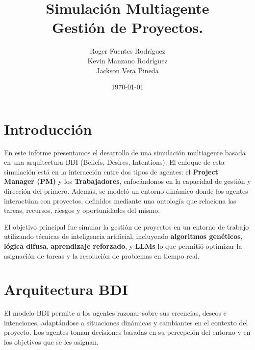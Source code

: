 \documentclass[a4paper, 12pt]{article}
\title{Simulación Multiagente \\ Gestión de Proyectos.}
\author{Roger Fuentes Rodr\'iguez \\ Kevin Manzano Rodr\'iguez \\ Jackson Vera Pineda}
\date{\today}
\begin{document}
\maketitle

\section{Introducción}
En este informe presentamos el desarrollo de una simulación multiagente basada en una arquitectura BDI (Beliefs, Desires, Intentions). El enfoque de esta simulación está en la interacción entre dos tipos de agentes: el \textbf{Project Manager (PM)} y los \textbf{Trabajadores}, enfocándonos en la capacidad de gestión y dirección del primero. Además, se modeló un entorno dinámico donde los agentes interactúan con proyectos, definidos mediante una ontología que relaciona las tareas, recursos, riesgos y oportunidades del mismo.

El objetivo principal fue simular la gestión de proyectos en un entorno de trabajo utilizando técnicas de inteligencia artificial, incluyendo \textbf{algoritmos genéticos}, \textbf{lógica difusa}, \textbf{aprendizaje reforzado}, y \textbf{LLMs} lo que permitió optimizar la asignación de tareas y la resolución de problemas en tiempo real.

\section{Arquitectura BDI}
El modelo BDI permite a los agentes razonar sobre sus creencias, deseos e intenciones, adaptándose a situaciones dinámicas y cambiantes en el contexto del proyecto. Los agentes toman decisiones basadas en su percepción del entorno y en los objetivos que se les asignan.
\end{document}
